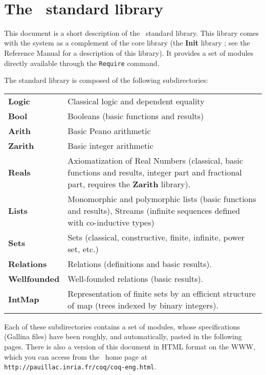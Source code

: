 \documentclass[11pt]{article}
\begin{document}
 
%
{\ }

\tableofcontents

\newpage
\section*{The \Coq\ standard library}

This document is a short description of the \Coq\ standard library.
This library comes with the system as a complement of the core library
(the {\bf Init} library ; see the Reference Manual for a description
of this library). It provides a set of modules directly available
through the \verb!Require! command.

The standard library is composed of the following subdirectories:

\medskip
\begin{tabular}{lp{12cm}}
  {\bf Logic}   & Classical logic and dependent equality \\
  {\bf Bool}    & Booleans (basic functions and results) \\
  {\bf Arith}   & Basic Peano arithmetic \\
  {\bf Zarith}  & Basic integer arithmetic \\
  {\bf Reals}   & Axiomatization of Real Numbers (classical, basic functions 
                  and results, integer part and fractional part,
                  requires the \textbf{Zarith} library).\\
  {\bf Lists}   & Monomorphic and polymorphic lists (basic functions and
                  results), Streams (infinite sequences defined 
                  with co-inductive types) \\
  {\bf Sets}    & Sets (classical, constructive, finite, infinite, power set,
                  etc.) \\
  {\bf Relations}   & Relations (definitions and basic results). \\
  {\bf Wellfounded} & Well-founded relations (basic results). \\
  {\bf IntMap}      & Representation of finite sets by an efficient
                      structure of map (trees indexed by binary integers).\\

\end{tabular}
\medskip

Each of these subdirectories contains a set of modules, whose
specifications ({\sf Gallina} files) have
been roughly, and automatically, pasted in the following pages. There
is also a version of this document in HTML format on the WWW, which
you can access from the \Coq\ home page at
\texttt{http://pauillac.inria.fr/coq/coq-eng.html}.


\end{document}
